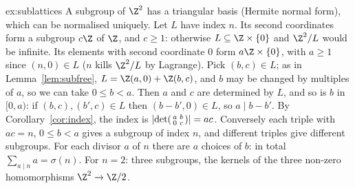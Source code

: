 \begin{solution}{ex:sublattices}
\idea A subgroup of $\Z^2$ has a triangular basis (Hermite normal form), which can be normalised uniquely.
\writeup Let $L$ have index $n$. Its second coordinates form a subgroup $c\Z$ of $\Z$, and $c\ge1$: otherwise $L\subseteq\Z\times\{0\}$ and $\Z^2/L$ would be infinite. Its elements with second coordinate $0$ form $a\Z\times\{0\}$, with $a\ge1$ since $(n,0)\in L$ ($n$ kills $\Z^2/L$ by Lagrange). Pick $(b,c)\in L$; as in Lemma~\ref{lem:subfree}, $L=\Z(a,0)+\Z(b,c)$, and $b$ may be changed by multiples of $a$, so we can take $0\le b<a$. Then $a$ and $c$ are determined by $L$, and so is $b$ in $[0,a)$: if $(b,c),(b',c)\in L$ then $(b-b',0)\in L$, so $a\mid b-b'$. By Corollary~\ref{cor:index}, the index is $\left|\det\begin{psmallmatrix}a&b\\0&c\end{psmallmatrix}\right|=ac$. Conversely each triple with $ac=n$, $0\le b<a$ gives a subgroup of index $n$, and different triples give different subgroups. For each divisor $a$ of $n$ there are $a$ choices of $b$: in total $\sum_{a\mid n}a=\sigma(n)$. For $n=2$: three subgroups, the kernels of the three non-zero homomorphisms $\Z^2\to\Z/2$.
\end{solution}

